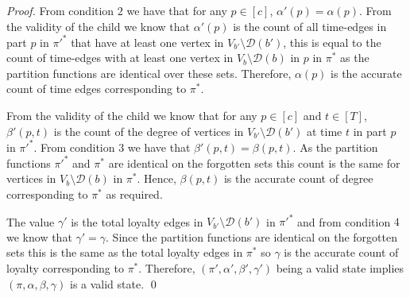 \documentclass[runningheads]{llncs}
\begin{document}
\begin{proof}
From condition $2$ we have that for any $p \in [c]$, $\alpha'(p)=\alpha(p)$. 
    From the validity of the child we know that $\alpha'(p)$ is the count of all time-edges in part $p$ in $\pi'^*$ that have at least one vertex in $V_{b'}\setminus \mathcal{D}(b')$, this is equal to the count of time-edges with at least one vertex in $V_{b}\setminus \mathcal{D}(b)$ in $p$ in $\pi^*$ as the partition functions are identical over these sets.
    Therefore, $\alpha(p)$ is the accurate count of time edges corresponding to $\pi^*$.
    
    From the validity of the child we know that for any $p \in [c]$ and $t \in [T]$, $\beta'(p,t)$ is the count of the degree of vertices in $V_{b'}\setminus \mathcal{D}(b')$ at time $t$ in part $p$ in $\pi'^*$. From condition $3$ we have that $\beta'(p,t)=\beta(p,t)$. As the partition functions $\pi'^*$ and $\pi^*$ are identical on the forgotten sets this count is the same for vertices in $V_{b}\setminus \mathcal{D}(b)$ in $\pi^*$.
    Hence, $\beta(p,t)$ is the accurate count of degree corresponding to $\pi^*$ as required.
    
The value $\gamma'$ is the total loyalty edges in $V_{b'}\setminus \mathcal{D}(b')$ in $\pi'^*$ and from condition $4$ we know that $\gamma'=\gamma$. Since the partition functions are identical on the forgotten sets this is the same as the total loyalty edges in $\pi^*$ so $\gamma$ is the accurate count of loyalty corresponding to $\pi^*$.
   Therefore, $(\pi',\alpha',\beta',\gamma')$ being a valid state implies $(\pi,\alpha,\beta,\gamma)$ is a valid state.
\qed
\end{proof}

\newpage
\end{document}

